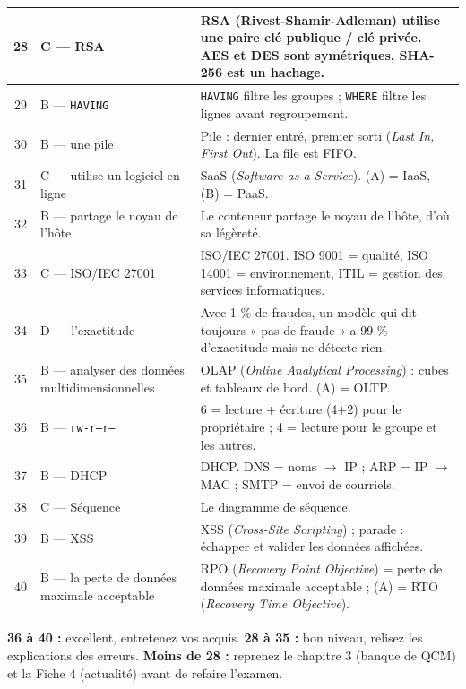 {\begin{longtable}{|c|>{\raggedright\arraybackslash}p{4.6cm}|p{9.2cm}|}
28 & C --- RSA & RSA (Rivest-Shamir-Adleman) utilise une paire clé publique / clé privée. AES et DES sont symétriques, SHA-256 est un hachage. \\ \hline
29 & B --- \texttt{HAVING} & \texttt{HAVING} filtre les groupes ; \texttt{WHERE} filtre les lignes avant regroupement. \\ \hline
30 & B --- une pile & Pile : dernier entré, premier sorti (\textit{Last In, First Out}). La file est FIFO. \\ \hline
31 & C --- utilise un logiciel en ligne & SaaS (\textit{Software as a Service}). (A) = IaaS, (B) = PaaS. \\ \hline
32 & B --- partage le noyau de l'hôte & Le conteneur partage le noyau de l'hôte, d'où sa légèreté. \\ \hline
33 & C --- ISO/IEC 27001 & ISO/IEC 27001. ISO 9001 = qualité, ISO 14001 = environnement, ITIL = gestion des services informatiques. \\ \hline
34 & D --- l'exactitude & Avec 1 \% de fraudes, un modèle qui dit toujours « pas de fraude » a 99 \% d'exactitude mais ne détecte rien. \\ \hline
35 & B --- analyser des données multidimensionnelles & OLAP (\textit{Online Analytical Processing}) : cubes et tableaux de bord. (A) = OLTP. \\ \hline
36 & B --- \texttt{rw-r--r--} & 6 = lecture + écriture (4+2) pour le propriétaire ; 4 = lecture pour le groupe et les autres. \\ \hline
37 & B --- DHCP & DHCP. DNS = noms $\rightarrow$ IP ; ARP = IP $\rightarrow$ MAC ; SMTP = envoi de courriels. \\ \hline
38 & C --- Séquence & Le diagramme de séquence. \\ \hline
39 & B --- XSS & XSS (\textit{Cross-Site Scripting}) ; parade : échapper et valider les données affichées. \\ \hline
40 & B --- la perte de données maximale acceptable & RPO (\textit{Recovery Point Objective}) = perte de données maximale acceptable ; (A) = RTO (\textit{Recovery Time Objective}). \\ \hline
\end{longtable}
}

\begin{tcolorbox}[colback=blue!5!white,colframe=blue!75!black,title=\textbf{Interpréter votre score}]
\textbf{36 à 40 :} excellent, entretenez vos acquis. \textbf{28 à 35 :} bon niveau, relisez les explications des erreurs. \textbf{Moins de 28 :} reprenez le chapitre 3 (banque de QCM) et la Fiche 4 (actualité) avant de refaire l'examen.
\end{tcolorbox}

